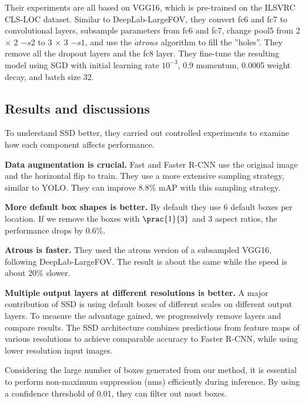 \documentclass{ieeeaccess}
\begin{document}
Their experiments are all based on VGG16, which is pre-trained on the ILSVRC CLS-LOC dataset. Similar to DeepLab-LargeFOV, they convert
fc6 and fc7 to convolutional layers, subsample parameters from fc6 and fc7, change pool5 from 2 × 2 $− s2$ to 3 × 3 $− s1$, and use the $\acute{a} trous$ algorithm  to fill the ”holes”. They remove all the dropout layers and the fc8 layer. They fine-tune the resulting model using SGD with initial learning rate $10^{-3}$, 0.9 momentum, 0.0005 weight decay, and batch size 32.

\subsection{Results and discussions}

To understand SSD better, they carried out controlled experiments to examine how each component affects performance.

\textbf{Data augmentation is crucial.} Fast and Faster R-CNN use the original image and the horizontal flip to train. They use a more extensive sampling strategy, similar to YOLO. They can improve 8.8\% mAP with this sampling strategy.

\textbf{More default box shapes is better.} By default they use 6 default boxes per location. If we remove the boxes with $\prac{1}{3}$ and 3 aspect ratios, the
performance drops by 0.6\%.

\textbf{Atrous is faster.} They used the atrous version of a subsampled VGG16, following DeepLab-LargeFOV. The result is about the same while the speed is about 20\% slower.

\textbf{Multiple output layers at different resolutions is better.} A major contribution of SSD is using default boxes of different scales on different output layers. To measure the advantage gained, we progressively remove layers and compare results. The SSD architecture combines predictions from feature maps of various resolutions to achieve comparable accuracy to Faster R-CNN, while using lower resolution input images.

Considering the large number of boxes generated from our method, it is essential to perform non-maximum suppression (nms) efficiently during inference. By using a confidence threshold of 0.01, they can filter out most boxes.
\end{document}
